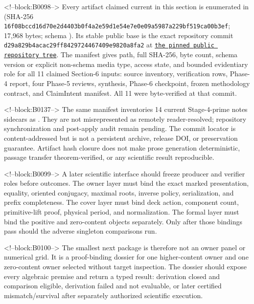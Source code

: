 \documentclass[11pt]{article}
\begin{document}
<!--block:B0098-->
\begingroup\sloppy
Every artifact claimed current in this section is enumerated in
 (SHA-256
\texttt{16f08bcc\allowbreak{}d16d70e2\allowbreak{}d4403b0f\allowbreak{}4a2e59d1\allowbreak{}e54e7e0e\allowbreak{}09a5987a\allowbreak{}229bf519\allowbreak{}ca00b3ef}; 17,968 bytes; schema
).  Its stable public
base is the exact repository commit
\texttt{d29a829b\allowbreak{}4acac29f\allowbreak{}f8429724\allowbreak{}467409e9\allowbreak{}820a8fa2} at
\href{https://github.com/maris205/hilbert-polya-structure/tree/d29a829b4acac29ff8429724467409e9820a8fa2/flow_systems/papers/32-homology-cover-renormalization-uniformity}{\texttt{the pinned public repository tree}}.
The manifest gives path, full SHA-256, byte count, schema version or explicit
non-schema media type, access state, and bounded evidentiary role for all 11
claimed Section-6 inputs: source inventory, verification rows, Phase-4 report,
four Phase-5 reviews, synthesis, Phase-6 checkpoint, frozen methodology
contract, and ClaimIntent manifest.  All 11 were byte-verified at that commit.

<!--block:B0137-->
The same manifest inventories 14 current Stage-4-prime notes sidecars as
.  They are
not misrepresented as remotely reader-resolved; repository synchronization and
post-apply audit remain pending.  The commit locator is content-addressed but is
not a persistent archive, release DOI, or preservation guarantee.  Artifact
hash closure does not make prose generation deterministic, passage transfer
theorem-verified, or any scientific result reproducible.
\par\endgroup

<!--block:B0099-->
A later scientific interface should freeze producer and verifier roles
before outcomes. The owner layer must bind the exact marked
presentation, equality, oriented conjugacy, maximal roots, inverse
policy, serialization, and prefix completeness. The cover layer must
bind deck action, component count, primitive-lift proof, physical
period, and normalization. The formal layer must bind the positive and
zero-content objects separately. Only after those bindings pass should
the adverse singleton comparisons run.

<!--block:B0100-->
The smallest next package is therefore not an owner panel or numerical
grid. It is a proof-binding dossier for one higher-content owner and one
zero-content owner selected without target inspection. The dossier
should expose every algebraic premise and return a typed result:
derivation closed and comparison eligible, derivation failed and not
evaluable, or later certified mismatch/survival after separately
authorized scientific execution.
\end{document}
